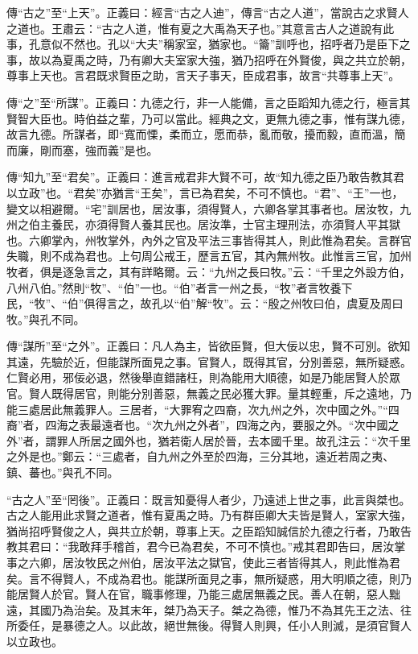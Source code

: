 {\noindent\zhuan{}\fzbyks 傳“古之”至“上天”。正義曰：經言“古之人迪”，傳言“古之人道”，當說古之求賢人之道也。王肅云：“古之人道，惟有夏之大禹為天子也。”其意言古人之道說有此事，孔意似不然也。孔以“大夫”稱家室，猶家也。“籥”訓呼也，招呼者乃是臣下之事，故以為夏禹之時，乃有卿大夫室家大強，猶乃招呼在外賢俊，與之共立於朝，尊事上天也。言君既求賢臣之助，言天子事天，臣成君事，故言“共尊事上天”。 \par}

{\noindent\zhuan{}\fzbyks 傳“之”至“所謀”。正義曰：九德之行，非一人能備，言之臣蹈知九德之行，極言其賢智大臣也。時伯益之輩，乃可以當此。經典之文，更無九德之事，惟有謀九德，故言九德。所謀者，即“寬而慄，柔而立，愿而恭，亂而敬，擾而毅，直而溫，簡而廉，剛而塞，強而義”是也。 \par}

{\noindent\zhuan{}\fzbyks 傳“知九”至“君矣”。正義曰：進言戒君非大賢不可，故“知九德之臣乃敢告教其君以立政”也。“君矣”亦猶言“王矣”，言已為君矣，不可不慎也。“君”、“王”一也，變文以相避爾。“宅”訓居也，居汝事，須得賢人，六卿各掌其事者也。居汝牧，九州之伯主養民，亦須得賢人養其民也。居汝準，士官主理刑法，亦須賢人平其獄也。六卿掌內，州牧掌外，內外之官及平法三事皆得其人，則此惟為君矣。言群官失職，則不成為君也。上句周公戒王，歷言五官，其內無州牧。此惟言三官，加州牧者，俱是逐急言之，其有詳略爾。云：“九州之長曰牧。”云：“千里之外設方伯，八州八伯。”然則“牧”、“伯”一也。“伯”者言一州之長，“牧”者言牧養下民，“牧”、“伯”俱得言之，故孔以“伯”解“牧”。云：“殷之州牧曰伯，虞夏及周曰牧。”與孔不同。 \par}

{\noindent\zhuan{}\fzbyks 傳“謀所”至“之外”。正義曰：凡人為主，皆欲臣賢，但大佞以忠，賢不可別。欲知其遠，先驗於近，但能謀所面見之事。官賢人，既得其官，分別善惡，無所疑惑。仁賢必用，邪佞必退，然後舉直錯諸枉，則為能用大順德，如是乃能居賢人於眾官。賢人既得居官，則能分別善惡，無義之民必獲大罪。量其輕重，斥之遠地，乃能三處居此無義罪人。三居者，“大罪宥之四裔，次九州之外，次中國之外。”“四裔”者，四海之表最遠者也。“次九州之外者”，四海之內，要服之外。“次中國之外”者，謂罪人所居之國外也，猶若衛人居於晉，去本國千里。故孔注云：“次千里之外是也。”鄭云：“三處者，自九州之外至於四海，三分其地，遠近若周之夷、鎮、蕃也。”與孔不同。 \par}

{\noindent\shu{}\fzkt “古之人”至“罔後”。正義曰：既言知憂得人者少，乃遠述上世之事，此言與桀也。古之人能用此求賢之道者，惟有夏禹之時。乃有群臣卿大夫皆是賢人，室家大強，猶尚招呼賢俊之人，與共立於朝，尊事上天。之臣蹈知誠信於九德之行者，乃敢告教其君曰：“我敢拜手稽首，君今已為君矣，不可不慎也。”戒其君即告曰，居汝掌事之六卿，居汝牧民之州伯，居汝平法之獄官，使此三者皆得其人，則此惟為君矣。言不得賢人，不成為君也。能謀所面見之事，無所疑惑，用大明順之德，則乃能居賢人於官。賢人在官，職事修理，乃能三處居無義之民。善人在朝，惡人黜遠，其國乃為治矣。及其末年，桀乃為天子。桀之為德，惟乃不為其先王之法、往所委任，是暴德之人。以此故，絕世無後。得賢人則興，任小人則滅，是須官賢人以立政也。 \par}

